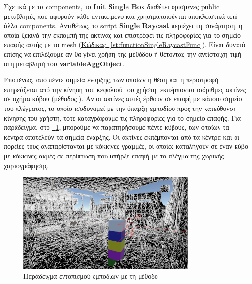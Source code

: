Σχετικά με τα components, το \textbf{Init Single Box} διαθέτει ορισμένες public μεταβλητές που αφορούν κάθε αντικείμενο και χρησιμοποιούνται αποκλειστικά από άλλα components. Αντιθέτως, το script \textbf{Single Raycast} περιέχει τη συνάρτηση, η οποία ξεκινά την εκπομπή της ακτίνας και επιστρέφει τις πληροφορίες για το σημείο επαφής αυτής με το mesh (\hyperref[lst:functionSingleRaycastFunc]{Κώδικας~\ref*{lst:functionSingleRaycastFunc}}). Είναι δυνατό επίσης να επιλέξουμε αν θα γίνει χρήση της μεθόδου  ή  θέτοντας την αντίστοιχη τιμή στη μεταβλητή  του \textbf{variableAggObject}.



Επομένως, από πέντε σημεία έναρξης, των οποίων η θέση και η περιστροφή επηρεάζεται από την κίνηση του κεφαλιού του χρήστη, εκπέμπονται ισάριθμες ακτίνες σε σχήμα κύβου (μέθοδος ). Αν οι ακτίνες αυτές έρθουν σε επαφή με κάποιο σημείο του πλέγματος, το οποίο ισοδυναμεί με την ύπαρξη εμποδίου προς την κατεύθυνση κίνησης του χρήστη, τότε καταγράφουμε τις πληροφορίες για το σημείο επαφής. Για παράδειγμα, στο \hyperref[fig:developBoxCastExample]{\schema~\ref*{fig:developBoxCastExample}}, μπορούμε να παρατηρήσουμε πέντε κύβους, των οποίων τα κέντρα αποτελούν τα σημεία έναρξης. Οι ακτίνες εκπέμπονται από τα κέντρα και οι πορείες τους αναπαρίστανται με κόκκινες γραμμές, οι οποίες καταλήγουν σε έναν κύβο με κόκκινες ακμές σε περίπτωση που υπήρξε επαφή με το πλέγμα της χωρικής χαρτογράφησης.

\begin{figure}[!ht]
    \centering
    \includegraphics[width=0.8\textwidth]{images/develop_boxCastExample.png}
    \caption{Παράδειγμα εντοπισμού εμποδίων με τη μέθοδο }\label{fig:developBoxCastExample}
\end{figure}

